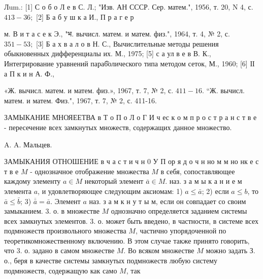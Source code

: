 \documentclass[10pt]{article}
\begin{document}
Лum.: [1] С о б о Л е в С. Л.; "Изв. АН СССР. Сер. матем.", 1956, т. 20, N 4, с. $413-36 ;$ [2] Б а б у ш к а И., П р а г е р

м. В и т а с е к Э., "भ. вычисл. матем. и матем. физ.", 1964, т. 4, № 2, с. $351-53 ;$ [3] Б а х в а л о в Н. С., Вычислительные методы решения обыкновенных дифференциалы их. М., 1975; [5] с а ул в е в В. К., Интегрирование уравнений параб̆олического типа методом сеток, М., 1960; [6] ІІ а П к и н А. Ф.,

«Ж. вычисл. матем. и матем. физ.», 1967, т. 7, № 2, с. $411-16$. “Ж. вычисл. матем. и матем. Физ.", 1967, т. 7, № 2, с. 411-16.



ЗАМЫКАНИЕ МНОЯЕЕТВА в Т о П о Л о Г И ч ес к о м п р о с т р а н с т в е - пересечение всех замкнутых множеств, содержащих данное множество.



A. A. Мальцев.



ЗАМЫКАНИЯ ОТНОШЕНИЕ в ч а с т и ч н 0 У П ор я д о ч н но м м но нк е с т в е $M$ - однозначное отображение множества $M$ в себя, сопоставляющее каждому элементу $a \in M$ некоторый элемент $\bar{a} \in M$. наз. з а м ы к а н и е м элемента $a$, и удовлетворяющее следующим аксиомам: 1) $a \leqslant \bar{a}$; 2) если $a \leqslant b$, то $\bar{a} \leqslant \bar{b}$; 3) $\overline{\bar{a}}=\bar{a}$. Элемент $a$ наз. $з$ а м к н у т ы м, если он совпадает со своим замыканием. 3. о. в множестве $M$ однозначно определяется заданием системы всех замкнутых элементов. 3. о. может быть введено, в частности, в системе всех подмножеств произвольного множества $M$, частично упорядоченной по теоретикомножественному включению. В этом случае также принято говорить, что 3. о. задано в самом множестве $M$. Во всяком множестве $M$ можно задать З. о., беря в качестве системы замкнутых подмножеств любую систему подмножеств, содержащую как само $M$, так
\end{document}
